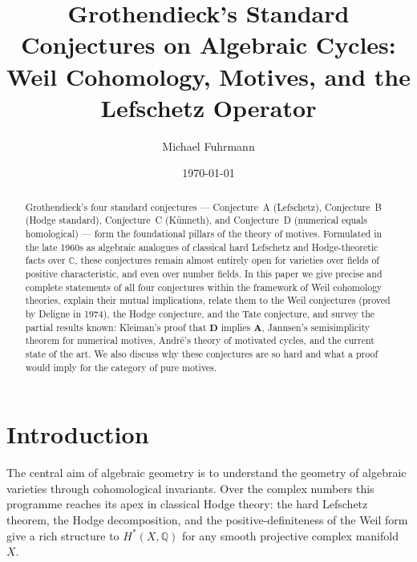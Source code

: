 \documentclass[12pt,a4paper]{amsart}
\theoremstyle{definition}
\newcommand{\Q}{\mathbb{Q}}
\begin{document}

\title{Grothendieck's Standard Conjectures on Algebraic Cycles:\\
       Weil Cohomology, Motives, and the Lefschetz Operator}

\author{Michael Fuhrmann}
\address{Specialist Mathematics Project, Build 170}
\date{\today}

\begin{abstract}
Grothendieck's four standard conjectures --- Conjecture~A (Lefschetz),
Conjecture~B (Hodge standard), Conjecture~C (K\"unneth), and Conjecture~D
(numerical equals homological) --- form the foundational pillars of the
theory of motives.  Formulated in the late 1960s as algebraic analogues of
classical hard Lefschetz and Hodge-theoretic facts over $\mathbb{C}$, these
conjectures remain almost entirely open for varieties over fields of positive
characteristic, and even over number fields.  In this paper we give precise
and complete statements of all four conjectures within the framework of Weil
cohomology theories, explain their mutual implications, relate them to the
Weil conjectures (proved by Deligne in 1974), the Hodge conjecture, and the
Tate conjecture, and survey the partial results known: Kleiman's proof that
$\mathbf{D}$ implies $\mathbf{A}$, Jannsen's semisimplicity theorem for
numerical motives, Andr\'e's theory of motivated cycles, and the current
state of the art.  We also discuss why these conjectures are so hard and
what a proof would imply for the category of pure motives.
\end{abstract}

\maketitle

\tableofcontents

\section{Introduction}

The central aim of algebraic geometry is to understand the geometry of
algebraic varieties through cohomological invariants.  Over the complex
numbers this programme reaches its apex in classical Hodge theory: the
hard Lefschetz theorem, the Hodge decomposition, and the positive-definiteness
of the Weil form give a rich structure to $H^*(X,\Q)$ for any smooth
projective complex manifold~$X$.
\end{document}
